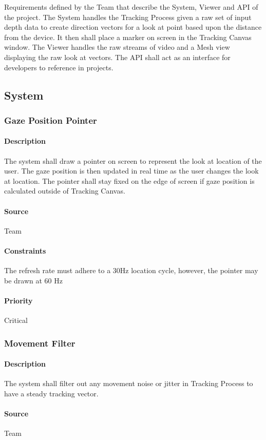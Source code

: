 
Requirements defined by the Team that describe the System, Viewer and API of the project.  The System handles the Tracking Process given a raw set of input depth data to create direction vectors for a look at point based upon the distance from the device.  It then shall place a marker on screen in the Tracking Canvas window.  The Viewer handles the raw streams of video and a Mesh view displaying the raw look at vectors.  The API shall act as an interface for developers to reference in projects.
\subsection{System}
\subsubsection{Gaze Position Pointer}
\paragraph{Description}
The system shall draw a pointer on screen to represent the look at location of the user.  The gaze position is then updated in real time as the user changes the look at location.  The pointer shall stay fixed on the edge of screen if gaze position is calculated outside of Tracking Canvas.
\paragraph{Source}
Team
\paragraph{Constraints}
The refresh rate must adhere to a 30Hz location cycle, however, the pointer may be drawn at 60 Hz
\paragraph{Priority}
Critical
\subsubsection{Movement Filter}
\paragraph{Description}
The system shall filter out any movement noise or jitter in Tracking Process to have a steady tracking vector.
\paragraph{Source}
Team
